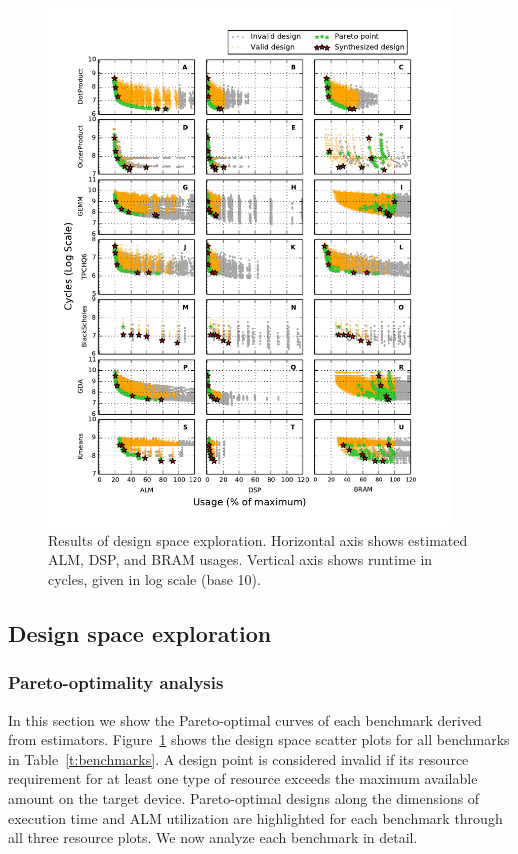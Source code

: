 \begin{figure}[!htbp]
\centering
\includegraphics[width=0.95\textwidth]{figs/tradeoff.pdf}
\caption{Results of design space exploration. Horizontal axis shows estimated ALM, DSP, and BRAM usages. Vertical axis shows runtime in cycles, given in log scale (base 10).}
\label{fig:dse}
\end{figure}

\subsection{Design space exploration}
\subsubsection{Pareto-optimality analysis}
In this section we show the Pareto-optimal curves of each benchmark derived from estimators.
%
Figure~\ref{fig:dse} shows the design space scatter plots for all benchmarks in
Table~\ref{t:benchmarks}. A design point is considered
invalid if its resource requirement for at least one type of resource exceeds the maximum
available amount on the target device. Pareto-optimal designs along the dimensions of execution time
and ALM utilization are highlighted for each benchmark through all three resource plots.
We now analyze each benchmark in detail.

